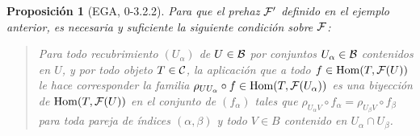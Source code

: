 \documentclass[twoside]{article}
\newtheorem{propo}[defin]{Proposición}
\begin{document}
\begin{propo}[EGA, 0-3.2.2]\label{haztop}
Para que el prehaz $\mathcal{F}'$ definido en el ejemplo anterior, es necesaria y suficiente la siguiente condición sobre $\mathcal{F}$:

\begin{verse}


Para todo recubrimiento $(U_{\alpha})$ de $U\in{\mathcal B}$ por conjuntos $U_\alpha\in{\mathcal B}$ contenidos en $U$, y por todo objeto $T\in{\mathcal C}$, la aplicación que a todo $f\in\operatorname{Hom}(T,\mathcal{F}(U))$ le hace corresponder la familia $\rho_{UU_\alpha}\circ f\in\operatorname{Hom}(T,\mathcal{F}(U_\alpha))$ es una biyección de $\operatorname{Hom}(T,\mathcal{F}(U))$ en el conjunto de $(f_\alpha)$ tales que $\rho_{U_\alpha V}\circ f_\alpha=\rho_{U_\beta V}\circ f_\beta$ para toda pareja de índices $(\alpha,\beta)$ y todo $V\in B$ contenido en $U_\alpha\cap U_\beta$. 
\end{verse}
\end{propo}
\end{document}
